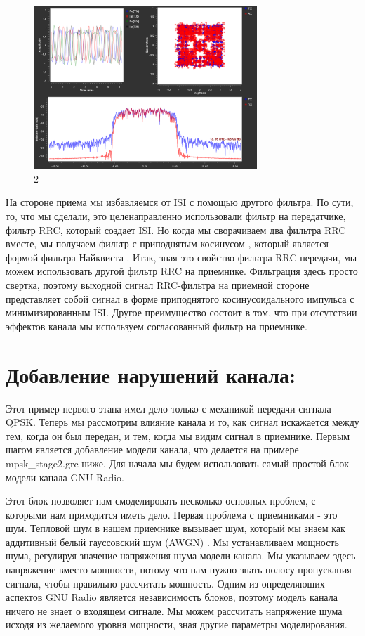 \documentclass[10pt,a4paper,oneside]{article}
\begin{document}
\begin{figure}[H]
        \centering
        \includegraphics[width=0.75\textwidth]{pics/3.png}
        \caption{2}
        \label{fig:first}
\end{figure}

На стороне приема мы избавляемся от ISI с помощью другого фильтра. По сути, то, что мы сделали, это целенаправленно использовали фильтр на передатчике, фильтр RRC, который создает ISI. Но когда мы сворачиваем два фильтра RRC вместе, мы получаем фильтр с приподнятым косинусом , который является формой фильтра Найквиста . Итак, зная это свойство фильтра RRC передачи, мы можем использовать другой фильтр RRC на приемнике. Фильтрация здесь просто свертка, поэтому выходной сигнал RRC-фильтра на приемной стороне представляет собой сигнал в форме приподнятого косинусоидального импульса с минимизированным ISI. Другое преимущество состоит в том, что при отсутствии эффектов канала мы используем согласованный фильтр на приемнике.

\section{Добавление нарушений канала:}

Этот пример первого этапа имел дело только с механикой передачи сигнала QPSK. Теперь мы рассмотрим влияние канала и то, как сигнал искажается между тем, когда он был передан, и тем, когда мы видим сигнал в приемнике. Первым шагом является добавление модели канала, что делается на примере mpsk_stage2.grc ниже. Для начала мы будем использовать самый простой блок модели канала GNU Radio.

Этот блок позволяет нам смоделировать несколько основных проблем, с которыми нам приходится иметь дело. Первая проблема с приемниками - это шум. Тепловой шум в нашем приемнике вызывает шум, который мы знаем как аддитивный белый гауссовский шум (AWGN) . Мы устанавливаем мощность шума, регулируя значение напряжения шума модели канала. Мы указываем здесь напряжение вместо мощности, потому что нам нужно знать полосу пропускания сигнала, чтобы правильно рассчитать мощность. Одним из определяющих аспектов GNU Radio является независимость блоков, поэтому модель канала ничего не знает о входящем сигнале. Мы можем рассчитать напряжение шума исходя из желаемого уровня мощности, зная другие параметры моделирования.
\end{document}
